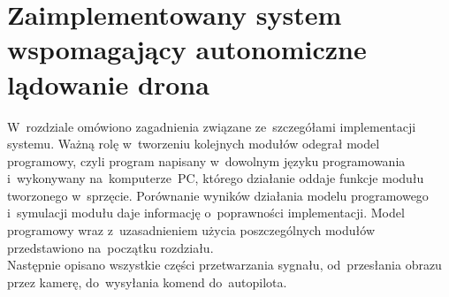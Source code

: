 \chapter{Zaimplementowany system wspomagający autonomiczne lądowanie drona}
\label{cha:opis_implementacji}
W~rozdziale omówiono zagadnienia związane ze~szczegółami implementacji systemu. Ważną rolę w~tworzeniu kolejnych modułów odegrał model programowy, czyli program napisany w~dowolnym języku programowania i~wykonywany na~komputerze~PC, którego działanie oddaje funkcje modułu tworzonego w~sprzęcie. Porównanie wyników działania modelu programowego i~symulacji modułu daje informację o~poprawności implementacji. Model programowy wraz z~uzasadnieniem użycia poszczególnych modułów przedstawiono na~początku rozdziału.\\
Następnie opisano wszystkie części przetwarzania sygnału, od~przesłania obrazu przez kamerę, do~wysyłania komend do~autopilota.

